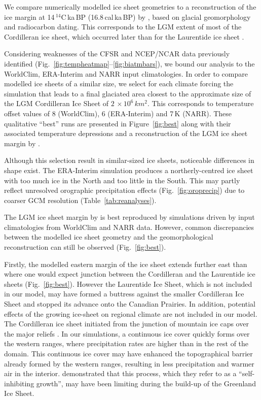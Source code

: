 We compare numerically modelled ice sheet geometries to a reconstruction of the ice margin at 14\,$^{14}$C\,ka\,BP (16.8\,cal\,ka\,BP) by \citet{dyke-2004}, based on glacial geomorphology and radiocarbon dating. This corresponds to the LGM extent of most of the Cordilleran ice sheet, which occurred later than for the Laurentide ice sheet \citep{dyke-2004}.

Considering weaknesses of the CFSR and NCEP/NCAR data previously identified (Fig.~\ref{fig:tempheatmap}--\ref{fig:biatmbars}), we bound our analysis to the  WorldClim, ERA-Interim and NARR input climatologies. In order to compare modelled ice sheets of a similar size, we select for each climate forcing the simulation that leads to a final glaciated area closest to the approximate size of the LGM Cordilleran Ice Sheet of $2\,\times10^6\,\unit{km^2}$. This corresponds to temperature offset values of 8 (WorldClim), 6 (ERA-Interim) and 7\,K (NARR). These qualitative “best” runs are presented in Figure~\ref{fig:best} along with their associated temperature depressions and a reconstruction of the LGM ice sheet margin by \citet{dyke-2004}.

Although this selection result in similar-sized ice sheets, noticeable differences in shape exist. The ERA-Interim simulation produces a northerly-centred ice sheet with too much ice in the North and too little in the South. This may partly reflect unresolved orographic precipitation effects (Fig.~\ref{fig:oroprecip}) due to coarser GCM resolution (Table~\ref{tab:reanalyses}).

The LGM ice sheet margin by \citet{dyke-2004} is best reproduced by simulations driven by input climatologies from WorldClim and NARR data. However, common discrepancies between the modelled ice sheet geometry and the geomorphological reconstruction can still be observed (Fig.~\ref{fig:best}).

Firstly, the modelled eastern margin of the ice sheet extends further east than where one would expect junction between the Cordilleran and the Laurentide ice sheets (Fig.~\ref{fig:best}). However the Laurentide Ice Sheet, which is not included in our model, may have formed a buttress against the smaller Cordilleran Ice Sheet and stopped its advance onto the Canadian Prairies. In addition, potential effects of the growing ice-sheet on regional climate are not included in our model. The Cordilleran ice sheet initiated from the junction of mountain ice caps over the major reliefs \citep{clague-1989}. In our simulations, a continuous ice cover quickly forms over the western ranges, where precipitation rates are higher than in the rest of the domain. This continuous ice cover may have enhanced the topographical barrier already formed by the western ranges, resulting in less precipitation and warmer air in the interior. \citet{langen-etal-2012} demonstrated that this process, which they refer to as a ``self-inhibiting growth'', may have been limiting during the build-up of the Greenland Ice Sheet.

